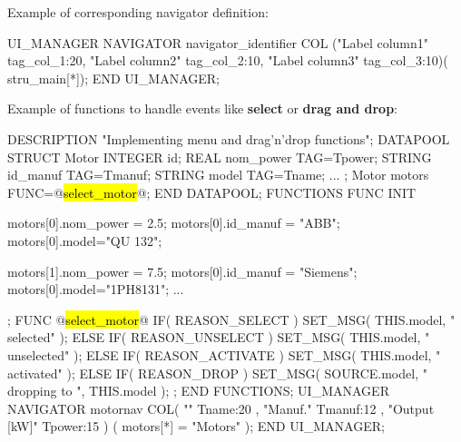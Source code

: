 Example of corresponding navigator definition: \\

\begin{boxedminipage}[t]{\linewidth}
\begin{intens}
UI_MANAGER
  NAVIGATOR
  navigator_identifier{
    COL ("Label column1" tag_col_1:20,
         "Label column2" tag_col_2:10,
         "Label column3" tag_col_3:10)}(
       stru_main[*]);
END UI_MANAGER;
\end{intens}
\end{boxedminipage}

\newpage
\label{navigatordragndrop}
Example of functions to handle events like {\bfseries select} or {\bfseries drag and drop}:

\begin{boxedminipage}[t]{\linewidth}
\begin{intens}[escapechar=@]
DESCRIPTION "Implementing menu and drag'n'drop functions";
DATAPOOL
  STRUCT Motor {
    INTEGER   id;
    REAL      nom_power        {TAG=Tpower};
    STRING    id_manuf         {TAG=Tmanuf};
    STRING    model            {TAG=Tname};
    ...
  };
  Motor motors  {FUNC=@\hl{select\_motor}@};
END DATAPOOL;
FUNCTIONS
  FUNC INIT {
    motors[0].nom_power = 2.5;
    motors[0].id_manuf = "ABB";
    motors[0].model="QU 132";

    motors[1].nom_power = 7.5;
    motors[0].id_manuf = "Siemens";
    motors[0].model="1PH8131";
    ...
  };
  FUNC @\hl{select\_motor}@ {
    IF( REASON_SELECT ){
      SET_MSG( THIS.model, " selected" ); }
    ELSE IF( REASON_UNSELECT ){
      SET_MSG( THIS.model, " unselected" ); }
    ELSE IF( REASON_ACTIVATE ){
      SET_MSG( THIS.model, " activated" ); }
    ELSE IF( REASON_DROP ){
      SET_MSG( SOURCE.model, " dropping to ", THIS.model ); }
  };
END FUNCTIONS;
UI_MANAGER
  NAVIGATOR
    motornav { COL( "" Tname:20
                  , "Manuf." Tmanuf:12
                  , "Output [kW]" Tpower:15 )} (
      motors[*] = "Motors" );
END UI_MANAGER;
\end{intens}
\end{boxedminipage}

